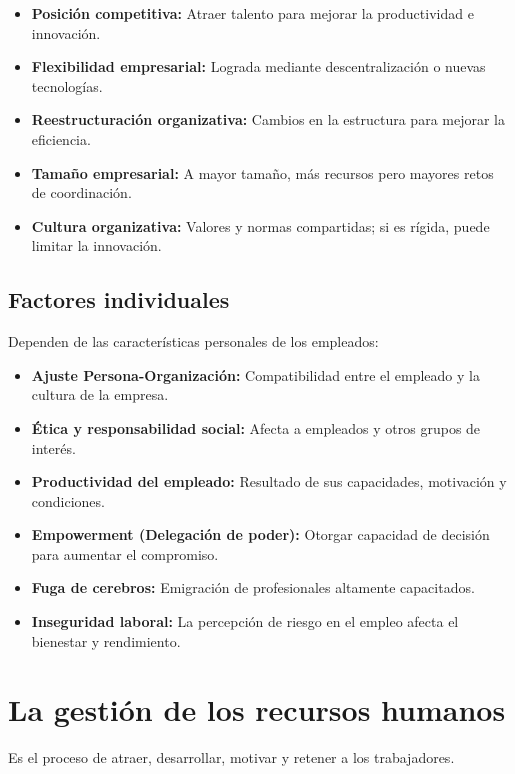 \begin{itemize}
    \item \textbf{Posición competitiva:} Atraer talento para mejorar la productividad e innovación.
    \item \textbf{Flexibilidad empresarial:} Lograda mediante descentralización o nuevas tecnologías.
    \item \textbf{Reestructuración organizativa:} Cambios en la estructura para mejorar la eficiencia.
    \item \textbf{Tamaño empresarial:} A mayor tamaño, más recursos pero mayores retos de coordinación.
    \item \textbf{Cultura organizativa:} Valores y normas compartidas; si es rígida, puede limitar la innovación.
\end{itemize}

\subsection{Factores individuales}
Dependen de las características personales de los empleados:

\begin{itemize}
    \item \textbf{Ajuste Persona-Organización:} Compatibilidad entre el empleado y la cultura de la empresa.
    \item \textbf{Ética y responsabilidad social:} Afecta a empleados y otros grupos de interés.
    \item \textbf{Productividad del empleado:} Resultado de sus capacidades, motivación y condiciones.
    \item \textbf{Empowerment (Delegación de poder):} Otorgar capacidad de decisión para aumentar el compromiso.
    \item \textbf{Fuga de cerebros:} Emigración de profesionales altamente capacitados.
    \item \textbf{Inseguridad laboral:} La percepción de riesgo en el empleo afecta el bienestar y rendimiento.
\end{itemize}



\section{La gestión de los recursos humanos}
Es el proceso de atraer, desarrollar, motivar y retener a los trabajadores.

